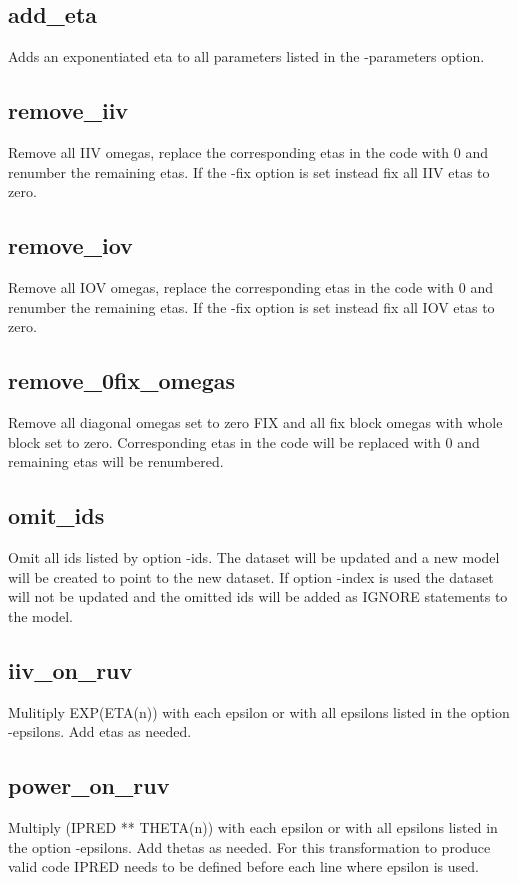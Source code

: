 \subsection{add\_eta}
Adds an exponentiated eta to all parameters listed in the -parameters option.

\subsection{remove\_iiv}
Remove all IIV omegas, replace the corresponding etas in the code with 0 and renumber the remaining etas. If the -fix option is set instead fix all IIV etas to zero.

\subsection{remove\_iov}
Remove all IOV omegas, replace the corresponding etas in the code with 0 and renumber the remaining etas. If the -fix option is set instead fix all IOV etas to zero.

\subsection{remove\_0fix\_omegas}
Remove all diagonal omegas set to zero FIX and all fix block omegas with whole block set to zero. Corresponding etas in the code will be replaced with 0 and remaining etas will be renumbered.

\subsection{omit\_ids}
Omit all ids listed by option -ids. The dataset will be updated and a new model will be created to point to the new dataset. If option -index is used the dataset will not be updated and the omitted ids will be added as IGNORE statements to the model.

\subsection{iiv\_on\_ruv}
Mulitiply EXP(ETA(n)) with each epsilon or with all epsilons listed in the option -epsilons. Add etas as needed.

\subsection{power\_on\_ruv}
Multiply (IPRED ** THETA(n)) with each epsilon or with all epsilons listed in the option -epsilons. Add thetas as needed. For this transformation to produce valid code IPRED needs to be defined before each line where epsilon is used.


